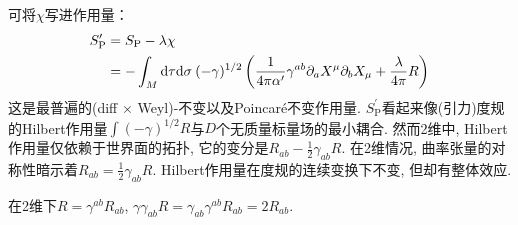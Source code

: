可将$\chi$写进作用量：
\begin{equation}
\begin{aligned}
S_{\mathrm{P}}^{\prime} &=S_{\mathrm{P}}-\lambda \chi \\
&=-\int_{M} \mathrm{d} \tau \mathrm{d} \sigma\:(-\gamma)^{1 / 2}\left(\frac{1}{4 \pi \alpha^{\prime}} \gamma^{a b} \partial_{a} X^{\mu} \partial_{b} X_{\mu}+\frac{\lambda}{4 \pi} R\right)
\end{aligned}
\end{equation}
这是最普遍的(diff $\times$ Weyl)-不变以及Poincar\'{e}不变作用量. $S_{\mathrm{P}}^\prime$看起来像(引力)度规的Hilbert作用量$\int (-\gamma)^{1/2}R$与$D$个无质量标量场的最小耦合. 然而2维中, Hilbert作用量仅依赖于世界面的拓扑, 它的变分是$R_{ab}-\frac{1}{2}\gamma_{ab}R$. 在2维情况, 曲率张量的对称性暗示着$R_{ab}=\frac{1}{2}\gamma_{ab}R$. Hilbert作用量在度规的连续变换下不变, 但却有整体效应. 
\begin{tcolorbox}
\begin{remark}
    在2维下$R=\gamma^{ab}R_{ab}$, $\gamma\gamma_{ab} R=\gamma_{ab}\gamma^{ab}R_{ab}=2R_{ab}$.
\end{remark}
\end{tcolorbox}

